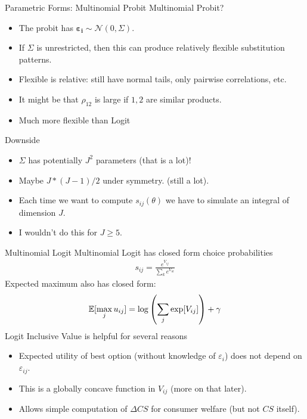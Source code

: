 \begin{frame}{Parametric Forms: Multinomial Probit}
Multinomial Probit?
\begin{itemize}
\item The probit has $\boldsymbol{\varepsilon_i} \sim \mathcal{N}(0,\Sigma)$.
\item If $\Sigma$ is unrestricted, then this can produce relatively flexible substitution patterns.
\item Flexible is relative: still have normal tails, only pairwise correlations, etc.
\item It might be that $\rho_{12}$ is large if $1,2$ are similar products.
\item Much more flexible than Logit
\end{itemize}
Downside
\begin{itemize}
\item $\Sigma$ has potentially $J^2$ parameters (that is a lot)!
\item Maybe $J * (J-1)/2$ under symmetry. (still a lot).
\item Each time we want to compute $s_{ij}(\theta)$ we have to simulate an integral of dimension $J$.
\item I wouldn't do this for $J \geq 5$.
\end{itemize}
\end{frame}


\begin{frame}{Multinomial Logit}
Multinomial Logit has closed form choice probabilities
\begin{align*}
s_{ij} = \frac{e^{V_{ij}}}{\sum_k e^{V_{ik}}} %
\end{align*}
 Expected maximum also has closed form:
\begin{align*}
\mathbb{E}[\max_j u_{ij}] = \log \left(\sum_j \exp[V_{ij}] \right) + \gamma
\end{align*}
Logit Inclusive Value is helpful for several reasons
\begin{itemize}
\item Expected utility of best option (without knowledge of $\varepsilon_i$) does not depend on $\varepsilon_{ij}$.
\item This is a globally concave function in $V_{ij}$ (more on that later).
\item Allows simple computation of $\Delta CS$ for consumer welfare (but not $CS$ itself).
\end{itemize}
\end{frame}

